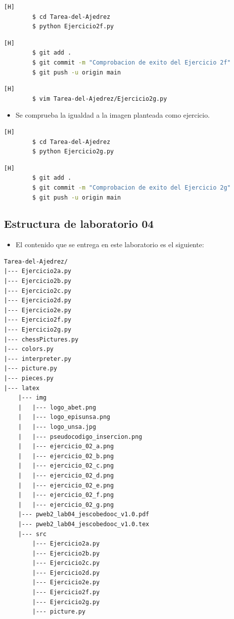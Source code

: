 \documentclass{article}
\begin{document}
	\begin{lstlisting}[language=bash,caption={Probando código}][H]
		$ cd Tarea-del-Ajedrez
		$ python Ejercicio2f.py
	\end{lstlisting}
	\begin{lstlisting}[language=bash,caption={Commit: Comprobacion de exito del Ejercicio 2f}][H]
		$ git add .
		$ git commit -m "Comprobacion de exito del Ejercicio 2f"			
		$ git push -u origin main
	\end{lstlisting}

 \begin{lstlisting}[language=bash,caption={Creando Ejercicio2g.py}][H]
		$ vim Tarea-del-Ajedrez/Ejercicio2g.py
	\end{lstlisting}
	
	
\begin{itemize}
    \item  Se comprueba la igualdad a la imagen planteada como ejercicio.
\end{itemize}

	\begin{lstlisting}[language=bash,caption={Probando código}][H]
		$ cd Tarea-del-Ajedrez
		$ python Ejercicio2g.py
	\end{lstlisting}
	\begin{lstlisting}[language=bash,caption={Commit: Comprobacion de exito del Ejercicio 2g}][H]
		$ git add .
		$ git commit -m "Comprobacion de exito del Ejercicio 2g"			
		$ git push -u origin main
	\end{lstlisting}
	\subsection{Estructura de laboratorio 04}
	\begin{itemize}	
		\item El contenido que se entrega en este laboratorio es el siguiente:
	\end{itemize}
	
\begin{lstlisting}[style=ascii-tree]
Tarea-del-Ajedrez/
|--- Ejercicio2a.py
|--- Ejercicio2b.py
|--- Ejercicio2c.py
|--- Ejercicio2d.py
|--- Ejercicio2e.py
|--- Ejercicio2f.py
|--- Ejercicio2g.py
|--- chessPictures.py
|--- colors.py
|--- interpreter.py
|--- picture.py
|--- pieces.py
|--- latex
    |--- img
    |   |--- logo_abet.png
    |   |--- logo_episunsa.png
    |   |--- logo_unsa.jpg
    |   |--- pseudocodigo_insercion.png
    |   |--- ejercicio_02_a.png
    |   |--- ejercicio_02_b.png
    |   |--- ejercicio_02_c.png
    |   |--- ejercicio_02_d.png
    |   |--- ejercicio_02_e.png
    |   |--- ejercicio_02_f.png
    |   |--- ejercicio_02_g.png
    |--- pweb2_lab04_jescobedooc_v1.0.pdf    
    |--- pweb2_lab04_jescobedooc_v1.0.tex 
    |--- src
        |--- Ejercicio2a.py
        |--- Ejercicio2b.py
        |--- Ejercicio2c.py
        |--- Ejercicio2d.py
        |--- Ejercicio2e.py
        |--- Ejercicio2f.py
        |--- Ejercicio2g.py
        |--- picture.py
\end{lstlisting}    
\clearpage
\end{document}
